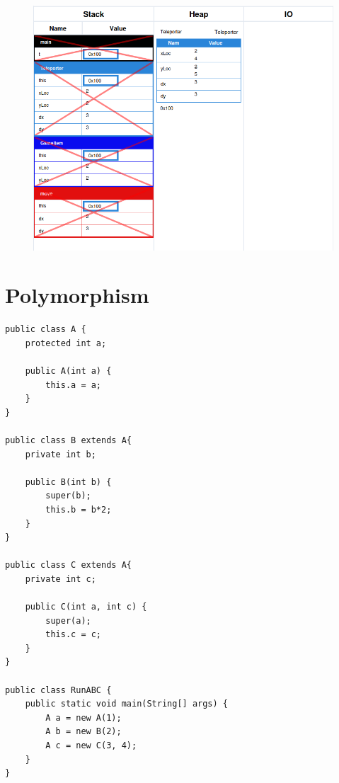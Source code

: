 \documentclass{article}
\begin{document}
\begin{figure}[H]
	\centering
	\includegraphics{inheritance.png}
\end{figure}

\pagebreak


\section{Polymorphism}

\begin{verbatim}
public class A {
    protected int a;

    public A(int a) {
        this.a = a;
    }
}

public class B extends A{
    private int b;

    public B(int b) {
        super(b);
        this.b = b*2;
    }
}

public class C extends A{
    private int c;

    public C(int a, int c) {
        super(a);
        this.c = c;
    }
}

public class RunABC {
    public static void main(String[] args) {
        A a = new A(1);
        A b = new B(2);
        A c = new C(3, 4);
    }
}
\end{verbatim}
\end{document}
